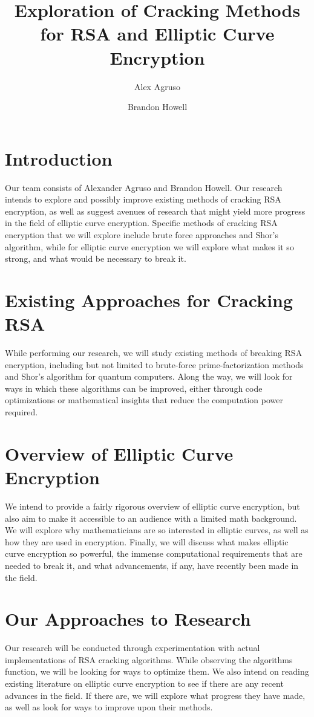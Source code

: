 \documentclass[12pt]{article}
\title{Exploration of Cracking Methods for RSA and Elliptic Curve Encryption}
\author{Alex Agruso \and Brandon Howell}
\begin{document}
\pagestyle{fancy}

\section*{Introduction}

Our team consists of Alexander Agruso and Brandon Howell. Our research intends to explore and possibly improve existing methods of cracking RSA encryption, as well as suggest avenues of research that might yield more progress in the field of elliptic curve encryption. Specific methods of cracking RSA encryption that we will explore include brute force approaches and Shor's algorithm, while for elliptic curve encryption we will explore what makes it so strong, and what would be necessary to break it.

\section*{Existing Approaches for Cracking RSA}

While performing our research, we will study existing methods of breaking RSA encryption, including but not limited to brute-force prime-factorization methods and Shor's algorithm for quantum computers. Along the way, we will look for ways in which these algorithms can be improved, either through code optimizations or mathematical insights that reduce the computation power required.

\section*{Overview of Elliptic Curve Encryption}

We intend to provide a fairly rigorous overview of elliptic curve encryption, but also aim to make it accessible to an audience with a limited math background. We will explore why mathematicians are so interested in elliptic curves, as well as how they are used in encryption. Finally, we will discuss what makes elliptic curve encryption so powerful, the immense computational requirements that are needed to break it, and what advancements, if any, have recently been made in the field.

\section*{Our Approaches to Research}

Our research will be conducted through experimentation with actual implementations of RSA cracking algorithms. While observing the algorithms function, we will be looking for ways to optimize them. We also intend on reading existing literature on elliptic curve encryption to see if there are any recent advances in the field. If there are, we will explore what progress they have made, as well as look for ways to improve upon their methods.
\end{document}
